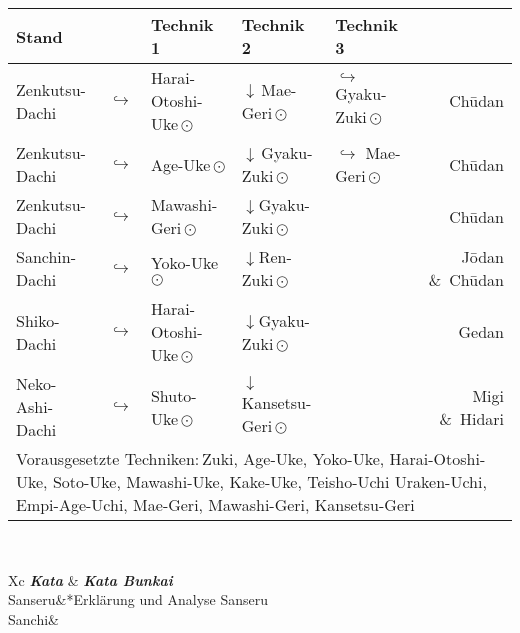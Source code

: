 \begin{tcolorbox}[width=\textwidth,height=\textheight,right=12pt,left=12pt,colframe=BKBELT,colback=white,fonttitle=\bfseries,coltitle=white,title=1. Dan:\indent Kihon-Ido Kata - Partnerformen - Erwartungshorizont]	
\null\vfill\null
{}
	\begin{tabularx}{\textwidth}{llllXr}
		\textbf{Stand} 	&  	& \textbf{Technik 1} & \textbf{Technik 2} 				& \textbf{Technik 3}&\\
		\midrule
		Zenkutsu-Dachi 	& \(\hookrightarrow\)	& Harai-Otoshi-Uke\,\(\odot\) 	& \(\downarrow\)\,Mae-Geri\,\(\odot\)	& \(\hookrightarrow\) 	 Gyaku-Zuki\,\(\odot\)	& Ch\={u}dan \\
		Zenkutsu-Dachi 	& \(\hookrightarrow\)	& Age-Uke\,\(\odot\) 			& \(\downarrow\)\,Gyaku-Zuki\,\(\odot\) & \(\hookrightarrow\)	 Mae-Geri\,\(\odot\)	& Ch\={u}dan \\
		Zenkutsu-Dachi 	& \(\hookrightarrow\)	& Mawashi-Geri\,\(\odot\) 		& \(\downarrow\)Gyaku-Zuki\,\(\odot\) 				&						&	 					 Ch\={u}dan \\
		Sanchin-Dachi 	& \(\hookrightarrow\)	& Yoko-Uke\,\(\odot\) 			& \(\downarrow\)Ren-Zuki\,\(\odot\) 					&						& 						 J\={o}dan \&~Ch\={u}dan \\
		Shiko-Dachi 	& \(\hookrightarrow\)	& Harai-Otoshi-Uke\,\(\odot\) 	& \(\downarrow\)Gyaku-Zuki\,\(\odot\) 				&						& 						 Gedan \\
		Neko-Ashi-Dachi	& \(\hookrightarrow\)	& Shuto-Uke\,\(\odot\) 			& \(\downarrow\)Kansetsu-Geri\,\(\odot\) 					&						& 						 Migi \&~Hidari  \\
		\midrule
		\multicolumn{6}{p{\linewidth-2\tabcolsep}}{{\footnotesize Vorausgesetzte Techniken:\,Zuki, Age-Uke, Yoko-Uke, Harai-Otoshi-Uke, Soto-Uke, Mawashi-Uke, Kake-Uke, Teisho-Uchi Uraken-Uchi, Empi-Age-Uchi, Mae-Geri, Mawashi-Geri, Kansetsu-Geri}}\\
		\midrule
	\end{tabularx}\\
	\begin{minipage}[t]{0.45\textwidth}
		\begin{tabularx}{\textwidth}{Xc}
			\midrule
			\textbf{\textit{Kata}} & \textbf{\textit{Kata Bunkai}} \\
			Sanseru&*{Erklärung und Analyse Sanseru}\\
			Sanchi& \\
			\midrule
		\end{tabularx}
	\end{minipage}

\end{tcolorbox}

